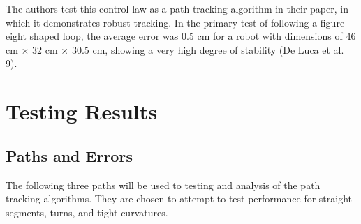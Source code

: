 \documentclass[mla7]{mla}
\begin{document}
\begin{paper}
The authors test this control law as a path tracking algorithm in their paper, in which it demonstrates robust tracking. In the primary test of following a figure-eight shaped loop, the average error was 0.5 cm for a robot with dimensions of 46 cm $\times$ 32 cm $\times$ 30.5 cm, showing a very high degree of stability (De Luca et al. 9). 

\section{Testing Results}

\subsection{Paths and Errors}

The following three paths will be used to testing and analysis of the path tracking algorithms. They are chosen to attempt to test performance for straight segments, turns, and tight curvatures.


\end{paper}
\end{document}
